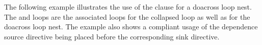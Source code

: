 


The following example illustrates the use of the  clause for
a doacross loop nest.  The  and  loops are the associated
loops for the collapsed loop as well as for the doacross loop nest.
The example also shows a compliant usage of the dependence source
directive being placed before the corresponding sink directive.


